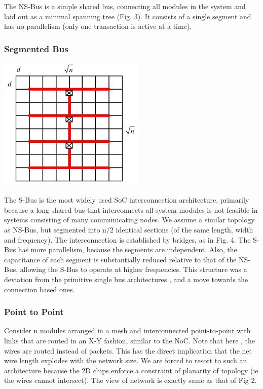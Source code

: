 The NS-Bus is a simple shared bus, connecting all modules in the system
and laid out as a minimal spanning tree (Fig. 3). It consists of a
single segment and has no parallelism (only one transaction is active
at a time). 


\subsubsection{Segmented Bus}

\includegraphics[width=7cm]{images/5}\cite{Bolotin:2004:CCN:1056481.1056484}%

The S-Bus is the most widely used SoC interconnection architecture,
primarily because a long shared bus that interconnects all system
modules is not feasible in systems consisting of many communicating
nodes. We assume a similar topology as NS-Bus, but segmented into
n/2 identical sections (of the same length, width and frequency).
The interconnection is established by bridges, as in Fig. 4. The S-Bus
has more parallelism, because the segments are independent. Also,
the capacitance of each segment is substantially reduced relative
to that of the NS-Bus, allowing the S-Bus to operate at higher frequencies.
This structure was a deviation from the primitive single bus architectures
, and a move towards the connection based ones.


\subsubsection{Point to Point}

Consider n modules arranged in a mesh and interconnected point-to-point
with links that are routed in an X-Y fashion, similar to the NoC.
Note that here , the wires are routed instead of packets. This has
the direct implication that the net wire length explodes with the
network size. We are forced to resort to such an architecture because
the 2D chips enforce a constraint of planarity of topology (ie the
wires cannot intersect). The view of network is exactly same as that
of Fig 2.


